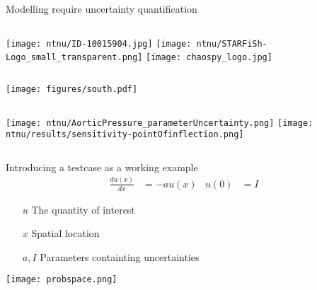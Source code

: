 \documentclass[handout]{beamer}
\begin{document}
\begin{frame}{Modelling require uncertainty quantification}{}
    \begin{columns}
        \texttt{[image: ntnu/ID-10015904.jpg]}
        \texttt{[image: ntnu/STARFiSh-Logo\_small\_transparent.png]}
        \texttt{[image: chaospy\_logo.jpg]}
    \end{columns} \pause
    \begin{center}
    \texttt{[image: figures/south.pdf]}
    \end{center}
    \begin{columns}
        \texttt{[image: ntnu/AorticPressure\_parameterUncertainty.png]}
        \texttt{[image: ntnu/results/sensitivity-pointOfinflection.png]}
    \end{columns}
    \end{frame}



\begin{frame}[fragile]
  {Introducing a testcase as a working example}
  \pause
  \begin{align*}
    \frac{d u(x)}{dx} & =-au(x) & u(0) &= I
  \end{align*}
  \begin{itemize}
    \item[$u$] The quantity of interest
    \item[$x$] Spatial location
    \item[$a,I$] Parameters containting uncertainties
  \end{itemize}
  \pause
  \begin{center}
    \texttt{[image: probspace.png]}
  \end{center}
\end{frame}



\end{document}

